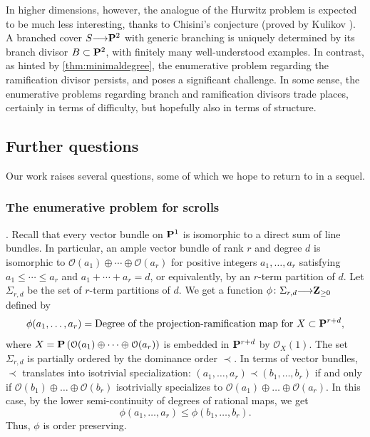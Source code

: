 \documentclass[11pt,reqno]{amsart}
\theoremstyle{plain}
\theoremstyle{definition}
\theoremstyle{remark}
\numberwithin{equation}{section}
\renewcommand{\to}{{\longrightarrow}}
\numberwithin{equation}{section}
\renewcommand{\O}{\mathcal O}
\begin{document}
In higher dimensions, however, the analogue of the Hurwitz problem is expected to be much less interesting, thanks to Chisini's conjecture (proved by Kulikov \cite{kul:08}).
A branched cover $S \to \P^2$ with generic branching is uniquely determined by its branch divisor $B \subset \P^2$, with finitely many well-understood examples.
In contrast, as hinted by \autoref{thm:minimaldegree}, the enumerative problem regarding the ramification divisor persists, and poses a significant challenge.
In some sense, the enumerative problems regarding branch and ramification divisors trade places, certainly in terms of difficulty, but hopefully also in terms of structure.


\subsection{Further questions}
Our work raises several questions, some of which we hope to return to in a sequel.
\subsubsection{The enumerative problem for scrolls}\label{sec:qscroll}.
Recall that every vector bundle on $\P^1$ is isomorphic to a direct sum of line bundles.
In particular, an ample vector bundle of rank $r$ and degree $d$ is isomorphic to $\O(a_1) \oplus \cdots \oplus \O(a_r)$ for positive integers $a_1, \dots, a_r$ satisfying $a_1 \leq \cdots \leq a_r$ and $a_1 + \cdots + a_r = d$, or equivalently, by an $r$-term partition of $d$.
Let $\Sigma_{r,d}$ be the set of $r$-term partitions of $d$.
We get a function $\phi \from \Sigma_{r,d} \to \Z_{\geq 0}$ defined by
\[ \phi(a_1, \dots, a_r) = \text{Degree of the projection-ramification map for $X \subset \P^{r+d}$},\]
where $X = \P\left( \O(a_1) \oplus \dots \oplus \O(a_r) \right)$ is embedded in $\P^{r+d}$ by $\O_X(1)$.
The set $\Sigma_{r,d}$ is partially ordered by the dominance order $\prec$.
In terms of vector bundles, $\prec$ translates into isotrivial specialization: $(a_1, \dots, a_r) \prec (b_1, \dots, b_r)$ if and only if $\O(b_1) \oplus \dots \oplus \O(b_r)$ isotrivially specializes to $\O(a_1) \oplus \dots \oplus \O(a_r)$.
In this case, by the lower semi-continuity of degrees of rational maps, we get
\[ \phi(a_1, \dots, a_r) \leq \phi(b_1,\dots, b_r).\]
Thus, $\phi$ is order preserving.
\end{document}
